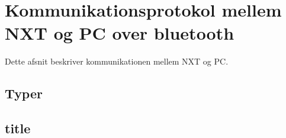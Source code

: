 \section{Kommunikationsprotokol mellem NXT og PC over bluetooth}
Dette afsnit beskriver kommunikationen mellem NXT og PC.
\subsection{Typer}

\subsection{title}